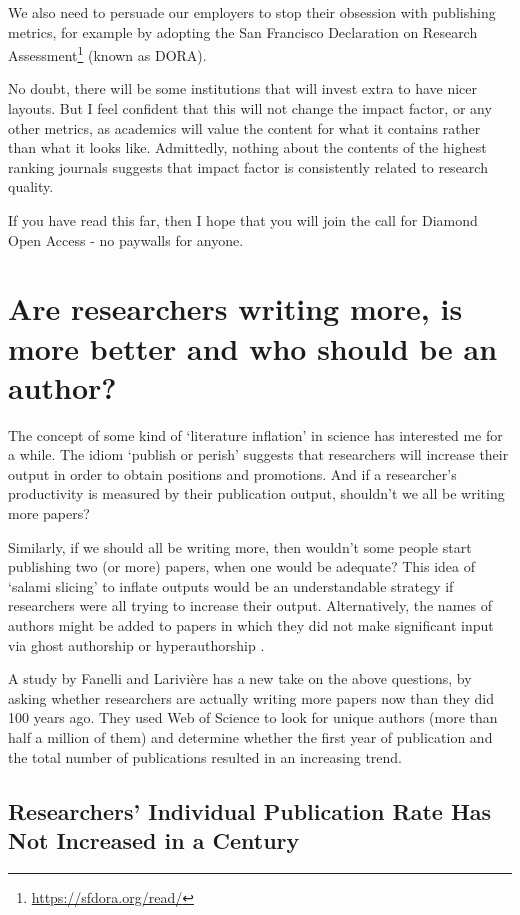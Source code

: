 \documentclass[
]{krantz}
\renewcommand{\href}[2]{#2\footnote{\url{#1}}}
\begin{document}
We also need to persuade our employers to stop their obsession with publishing metrics, for example by adopting the \href{https://sfdora.org/read/}{San Francisco Declaration on Research Assessment} (known as DORA).

No doubt, there will be some institutions that will invest extra to have nicer layouts. But I feel confident that this will not change the impact factor, or any other metrics, as academics will value the content for what it contains rather than what it looks like. Admittedly, nothing about the contents of the highest ranking journals suggests that impact factor is consistently related to research quality.

If you have read this far, then I hope that you will join the call for Diamond Open Access - no paywalls for anyone.

\hypertarget{publishmore}{%
\chapter{Are researchers writing more, is more better and who should be an author?}\label{publishmore}}

The concept of some kind of `literature inflation' in science has interested me for a while. The idiom `publish or perish' suggests that researchers will increase their output in order to obtain positions and promotions. And if a researcher's productivity is measured by their publication output, shouldn't we all be writing more papers?

Similarly, if we should all be writing more, then wouldn't some people start publishing two (or more) papers, when one would be adequate? This idea of `salami slicing' to inflate outputs would be an understandable strategy if researchers were all trying to increase their output. Alternatively, the names of authors might be added to papers in which they did not make significant input via ghost authorship or hyperauthorship \citep[see][ for an interesting historical perspective]{cronin2001hyperauthorship}.

A study by Fanelli and Larivière \citeyearpar{fanelli2016researchers} has a new take on the above questions, by asking whether researchers are actually writing more papers now than they did 100 years ago. They used Web of Science to look for unique authors (more than half a million of them) and determine whether the first year of publication and the total number of publications resulted in an increasing trend.

\hypertarget{researchers-individual-publication-rate-has-not-increased-in-a-century}{%
\section{Researchers' Individual Publication Rate Has Not Increased in a Century}\label{researchers-individual-publication-rate-has-not-increased-in-a-century}}
\end{document}
